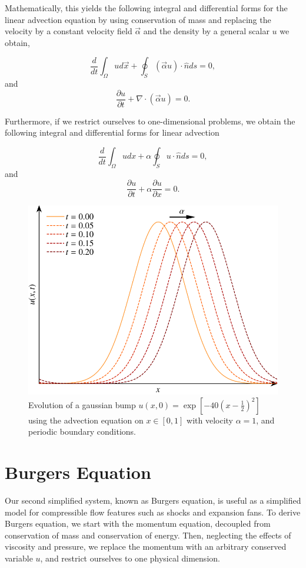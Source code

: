 Mathematically, this yields the following integral and differential forms for the linear advection equation by using conservation of mass and replacing the velocity by a constant velocity field $\vec{\alpha}$ and the density by a general scalar $u$ we obtain,
\begin{eqBox}
\begin{equation}
	\frac{d}{dt}\int_\Omega u d\vec{x} + \oint_S (\vec{\alpha}u) \cdot \hat{n} ds = 0,
\end{equation}
and
\begin{equation}
	\frac{\partial u}{\partial t} + \nabla \cdot (\vec{\alpha} u) = 0.
\end{equation}
\end{eqBox}
Furthermore, if we restrict ourselves to one-dimensional problems, we obtain the following integral and differential forms for linear advection
\begin{eqBox}
\begin{equation}
	\frac{d}{dt}\int_\Omega u dx + \alpha \oint_S u \cdot \hat{n} ds = 0,
\end{equation}
and
\begin{equation}
	\frac{\partial u}{\partial t} +  \alpha \frac{\partial u}{\partial x} = 0.
\end{equation}
\end{eqBox}
\begin{figure}[htbp]
	\centering
	\includegraphics[width=0.65\linewidth]{Pictures/advection_equation}
	\caption{Evolution of a gaussian bump $u(x,0)=\exp\left[-40\left(x-\frac{1}{2}\right)^2\right]$ using the advection equation on $x\in[0,1]$ with velocity $\alpha=1$, and periodic boundary conditions.}
	\label{fig:advection_equation}
\end{figure}

\section{Burgers Equation}
Our second simplified system, known as Burgers equation, is useful as a simplified model for compressible flow features such as shocks and expansion fans. To derive Burgers equation, we start with the momentum equation, decoupled from conservation of mass and conservation of energy. Then, neglecting the effects of viscosity and pressure, we replace the momentum with an arbitrary conserved variable $u$, and restrict ourselves to one physical dimension. 


